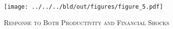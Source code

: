 \begin{figure}[t]
	\begin{center}
	    \texttt{[image: ../../../bld/out/figures/figure\_5.pdf]}
	    \caption{\textsc{Response to Both Productivity and Financial Shocks}}
	    \label{fig:figure_5}
    \end{center}
\end{figure}
